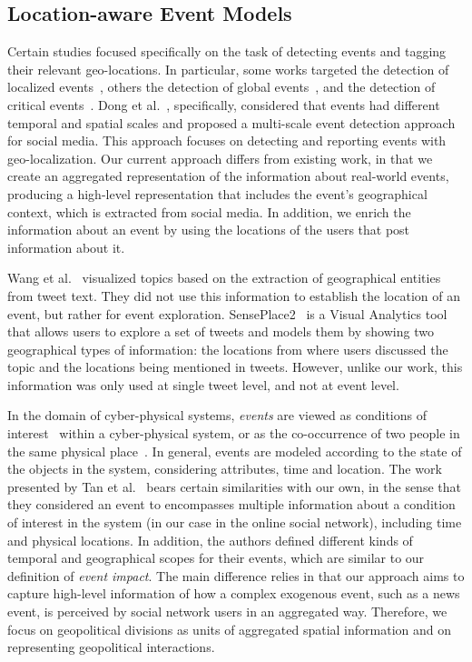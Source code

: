 

\subsection{Location-aware Event Models}\label{sec:geo-related}

Certain studies focused specifically on the task of detecting events and tagging
their relevant geo-locations. 
%
In particular, some works targeted the detection of localized
events~\cite{Watanabe:Jasmine:2011,Abdelhaq:EvenTweet:2013,Walther:2013fb,Lee:A:2011,Krumm:2015},
others the detection of global events~\cite{sankaranarayanan:twitterstand:2009},
and the detection of critical
events~\cite{Sakaki:Tweet:2013,DeLongueville:2009}.  
%
Dong et al.~\cite{Dong2015}, specifically, considered that events had different
temporal and spatial scales and proposed a multi-scale event detection approach
for social media. 
%
This approach focuses on detecting and reporting events with geo-localization.
%
Our current approach differs from existing work, in that we create an aggregated
representation of the information about real-world events, producing a
high-level representation that includes the event's geographical context, which
is extracted from social media. 
%
In addition, we enrich the information about an event by using the locations of
the users that post information about it.

Wang et al.~\cite{Wang:LeadLine:2012} visualized topics based on the extraction
of geographical entities from tweet text. 
%
They did not use this information to establish the location of an event, but
rather for event exploration. 
%
SensePlace2~\cite{MacEachren:SensePlace2:2011} is a Visual Analytics tool that
allows users to explore a set of tweets and models them by showing two
geographical types of information: the locations from where users discussed the
topic and the locations being mentioned in tweets. 
%
However, unlike our work, this information was only used at single tweet level,
and not at event level.

In the domain of cyber-physical systems, {\em events} are viewed as conditions
of interest~\cite{st-model_2009} within a cyber-physical system, or as the
co-occurrence of two people in the same physical place~\cite{STEvent_2010}.
%
In general, events are modeled according to the state of the objects in the
system, considering attributes, time and location. 
%
The work presented by Tan et al.~\cite{st-model_2009} bears certain similarities
with our own, in the sense that they considered an event to encompasses multiple
information about a condition of interest in the system (in our case in the
online social network), including time and physical locations. 
%
In addition, the authors defined different kinds of temporal and geographical
scopes for their events, which are similar to our definition of {\em event
impact}. 
%
The main difference relies in that our approach aims to capture high-level
information of how a complex exogenous event, such as a news event, is perceived
by social network users in an aggregated way. 
%
Therefore, we focus on geopolitical divisions as units of aggregated spatial
information and on representing geopolitical interactions.

